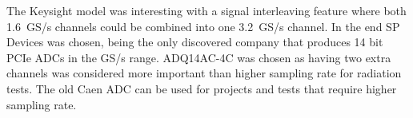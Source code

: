 \documentclass[../main/thesis.tex]{subfiles}
\begin{document}
The Keysight model was interesting with a signal interleaving feature where both 1.6~GS/s channels could be combined into one 3.2~GS/s channel. In the end SP Devices was chosen, being the only discovered company that produces 14 bit PCIe \gls{ADC}s in the GS/s range. ADQ14AC-4C was chosen as having two extra channels was considered more important than higher sampling rate for radiation tests. The old Caen \gls{ADC} can be used for projects and tests that require higher sampling rate. 
\end{document}
